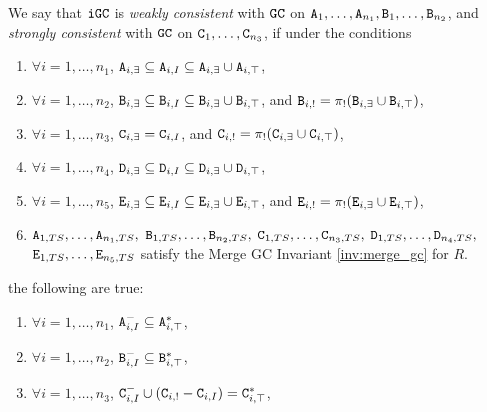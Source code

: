 \begin{property}
We say that $\tt{iGC}$ is \emph{weakly consistent} with $\tt{GC}$ on $\tt{A}_1, \dots, \tt{A}_{n_1}, \tt{B}_1, \dots, \tt{B}_{n_2}$, and \emph{strongly consistent} with $\tt{GC}$ on $\tt{C}_1, \dots, \tt{C}_{n_3}$, if under the conditions
\begin{enumerate}
\item $\forall i=1,\dots,n_1$, $\tt{A}_{i,\exists} \subseteq \tt{A}_{i,I} \subseteq \tt{A}_{i,\exists} \cup \tt{A}_{i,\top}$,
\item $\forall i=1,\dots,n_2$, $\tt{B}_{i,\exists} \subseteq \tt{B}_{i,I} \subseteq \tt{B}_{i,\exists} \cup \tt{B}_{i,\top}$, and $\tt{B}_{i,!} = \pi_!(\tt{B}_{i,\exists} \cup \tt{B}_{i,\top})$,
\item $\forall i=1,\dots,n_3$, $\tt{C}_{i,\exists} =         \tt{C}_{i,I}$,                                                   and $\tt{C}_{i,!} = \pi_!(\tt{C}_{i,\exists} \cup \tt{C}_{i,\top})$,
\item $\forall i=1,\dots,n_4$, $\tt{D}_{i,\exists} \subseteq \tt{D}_{i,I} \subseteq \tt{D}_{i,\exists} \cup \tt{D}_{i,\top}$,
\item $\forall i=1,\dots,n_5$, $\tt{E}_{i,\exists} \subseteq \tt{E}_{i,I} \subseteq \tt{E}_{i,\exists} \cup \tt{E}_{i,\top}$, and $\tt{E}_{i,!} = \pi_!(\tt{E}_{i,\exists} \cup \tt{E}_{i,\top})$,
\item $\tt{A}_{1,TS}, \dots, \tt{A}_{n_1,TS},$ $\tt{B}_{1,TS}, \dots, \tt{B}_{n_2,TS},$ $\tt{C}_{1,TS}, \dots, \tt{C}_{n_3,TS},$ $\tt{D}_{1,TS}, \dots, \tt{D}_{n_4,TS},$ $\tt{E}_{1,TS}, \dots, \tt{E}_{n_5,TS}$ satisfy the Merge GC Invariant \ref{inv:merge_gc} for $R$.
\end{enumerate}
the following are true:
\begin{enumerate}
\item $\forall i=1,\dots,n_1$, $\tt{A}_{i,I}^- \subseteq \tt{A}_{i,\top}^*$,
\item $\forall i=1,\dots,n_2$, $\tt{B}_{i,I}^- \subseteq \tt{B}_{i,\top}^*$,
\item $\forall i=1,\dots,n_3$, $\tt{C}_{i,I}^- \cup (\tt{C}_{i,!} - \tt{C}_{i,I}) =         \tt{C}_{i,\top}^*$,
\end{enumerate}
\end{property}


